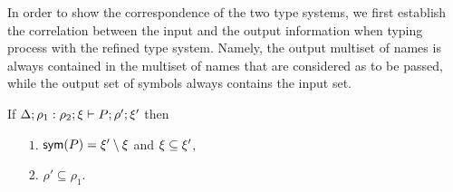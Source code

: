 In order to show the correspondence of the two type systems, we first establish the correlation between the input and the output information when typing process with the refined type system. Namely, the output multiset of names is always contained in the multiset of names that are considered as to be passed, while the output set of symbols always contains the input set.

\begin{lemma}[%
Monotonicity]{\label{lemm:algorithmic_monotonicity}}
If $\Delta; \rho_1: \rho_2; \xi \vdash P; \rho'; \xi'$ then
\begin{itemize}
\item [$1.$] $\mathsf{sym}(P)= \xi'\setminus \xi$ and $\xi \subseteq \xi'$,
\item [$2.$] $\rho'\subseteq \rho_1$.
\end{itemize}
\end{lemma}

